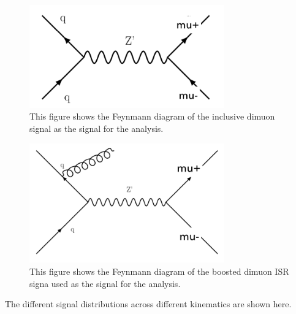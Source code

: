 \begin{figure}[!htb]
    \begin{center}
        \includegraphics[width=0.75\textwidth]{figures/chapter_dimuon/dimuonFeynman}
        \caption{
            This figure shows the Feynmann diagram of the inclusive dimuon signal as the signal for the analysis. }
            \label{fig:dimuonFeynmann}
    \end{center}
\end{figure}


\begin{figure}[!htb]
    \begin{center}
        \includegraphics[width=0.75\textwidth]{figures/chapter_dimuon/dimuonISRFeynmann}
        \caption{
        This figure shows the Feynmann diagram of the boosted dimuon ISR signa used as the signal for the analysis. }
            \label{fig:dimuonFeynmann}
    \end{center}
\end{figure}

    The different signal distributions across different kinematics are shown here. 

